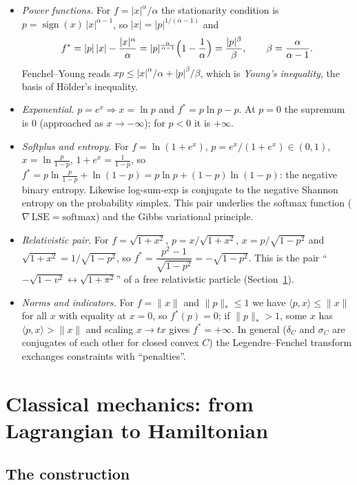 \documentclass[11pt,a4paper]{article}
\newcommand{\ip}[2]{\langle #1,#2\rangle}
\DeclareMathOperator{\sign}{sign}
\theoremstyle{plain}
\theoremstyle{definition}
\theoremstyle{remark}
\begin{document}
\begin{itemize}
  \item \emph{Power functions.} For $f=|x|^\alpha/\alpha$ the stationarity
  condition is $p=\sign(x)\,|x|^{\alpha-1}$, so $|x|=|p|^{1/(\alpha-1)}$ and
  \[
    f^*=|p|\,|x|-\frac{|x|^\alpha}{\alpha}
       =|p|^{\frac{\alpha}{\alpha-1}}\Bigl(1-\frac1\alpha\Bigr)=\frac{|p|^\beta}{\beta},
    \qquad \beta=\frac{\alpha}{\alpha-1}.
  \]
  Fenchel--Young reads $xp\le|x|^\alpha/\alpha+|p|^\beta/\beta$, which is
  \emph{Young's inequality}, the basis of H\"older's inequality.
  \item \emph{Exponential.} $p=e^x\Rightarrow x=\ln p$ and
  $f^*=p\ln p-p$.  At $p=0$ the supremum is $0$ (approached as
  $x\to-\infty$); for $p<0$ it is $+\infty$.
  \item \emph{Softplus and entropy.} For $f=\ln(1+e^x)$, $p=e^x/(1+e^x)\in(0,1)$,
  $x=\ln\frac p{1-p}$, $1+e^x=\frac1{1-p}$, so
  $f^*=p\ln\frac p{1-p}+\ln(1-p)=p\ln p+(1-p)\ln(1-p)$:
  the negative binary entropy.  Likewise log-sum-exp is conjugate to the
  negative Shannon entropy on the probability simplex.  This pair underlies
  the softmax function ($\nabla\,\mathrm{LSE}=\mathrm{softmax}$) and
  the Gibbs variational principle.
  \item \emph{Relativistic pair.} For $f=\sqrt{1+x^2}$, $p=x/\sqrt{1+x^2}$,
  $x=p/\sqrt{1-p^2}$ and $\sqrt{1+x^2}=1/\sqrt{1-p^2}$, so
  $f^*=\dfrac{p^2-1}{\sqrt{1-p^2}}=-\sqrt{1-p^2}$.  This is the pair
  ``$-\sqrt{1-v^2}\leftrightarrow\sqrt{1+\pi^2}$'' of a free relativistic
  particle (Section~\ref{sec:mech}).
  \item \emph{Norms and indicators.} For $f=\|x\|$ and $\|p\|_*\le1$ we have
  $\ip{p}{x}\le\|x\|$ for all $x$ with equality at $x=0$, so $f^*(p)=0$; if
  $\|p\|_*>1$, some $x$ has $\ip{p}{x}>\|x\|$ and scaling $x\to tx$ gives
  $f^*=+\infty$.  In general ($\delta_C$ and $\sigma_C$ are conjugates of each
  other for closed convex $C$) the Legendre--Fenchel transform exchanges
  constraints with ``penalties''.
\end{itemize}

\section{Classical mechanics: from Lagrangian to Hamiltonian}\label{sec:mech}

\subsection{The construction}
\end{document}
